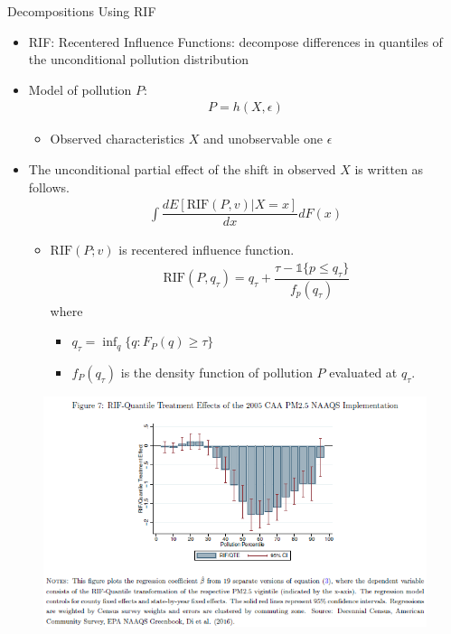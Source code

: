 \documentclass[dvipdfmx,12pt]{beamer}
\begin{document}
\begin{frame}{Decompositions Using RIF}
  \begin{itemize}
    \item RIF: Recentered Influence Functions: decompose differences in quantiles of the unconditional pollution distribution
    \item Model of pollution $P$:
    \begin{align*}
      P = h(X, \epsilon)
    \end{align*}
    \begin{itemize}
      \item Observed characteristics $X$ and unobservable one $\epsilon$
    \end{itemize}
  \end{itemize}
\end{frame}

\begin{frame}{}
  \begin{itemize}
    \item The unconditional partial effect of the shift in observed $X$ is written as follows.
    \begin{align*}
      \int \dfrac{dE[\text{RIF}(P, v) | X = x]}{dx}dF(x)
    \end{align*}
    \begin{itemize}
      \item $\text{RIF}(P; v)$ is recentered influence function. 
      \begin{align*}
        \text{RIF}(P, q_{\tau}) = q_{\tau} + \dfrac{\tau - \mathbb{1}\{p \leq q_{\tau}\}}{f_p(q_{\tau})}
      \end{align*}
      where 
      \begin{itemize}
        \item $q_{\tau} = \inf_q \{q: F_P(q) \geq \tau\}$
        \item $f_P(q_{\tau})$ is the density function of pollution $P$ evaluated at $q_{\tau}$.
      \end{itemize}
    \end{itemize}
  \end{itemize}
\end{frame}

\begin{frame}{}
  \begin{figure}
    \centering
    \includegraphics[scale = .7]{F7.png}
  \end{figure}
\end{frame}
\end{document}
